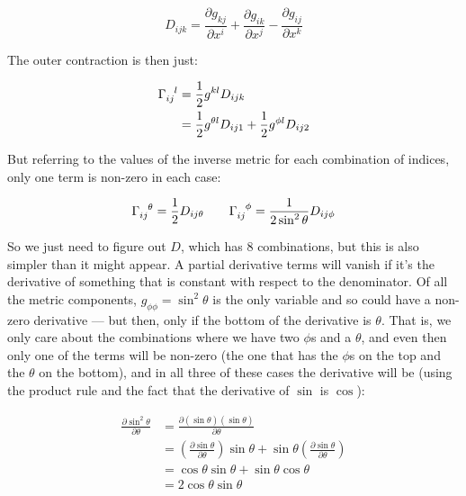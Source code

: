 $$
D_{ijk} 
= 
\frac{\partial g_{kj}}{\partial x^i} 
+
\frac{\partial g_{ik}}{\partial x^j} 
-
\frac{\partial g_{ij}}{\partial x^k} 
$$

The outer contraction is then just:

\begin{equation}    
\begin{split}
\Gamma\indices{_i_j^l}
&= \frac{1}{2} g^{kl} D_{ijk} \\
&= \frac{1}{2} g^{\theta l} D_{ij1} + \frac{1}{2} g^{\phi l} D_{ij2}
\end{split}
\end{equation}

But referring to the values of the inverse metric for each combination of indices, only one term is non-zero in each case:

$$
\Gamma\indices{_i_j^\theta} = \frac{1}{2} D_{ij\theta}
\quad \quad
\Gamma\indices{_i_j^\phi} = \frac{1}{2\sin^2 \theta} D_{ij\phi}
$$

So we just need to figure out $D$, which has 8 combinations, but this is also simpler than it might appear. A partial derivative terms will vanish if it's the derivative of something that is constant with respect to the denominator. Of all the metric components, $g_{\phi\phi} = \sin^2 \theta$ is the only variable and so could have a non-zero derivative --- but then, only if the bottom of the derivative is $\theta$. That is, we only care about the combinations where we have two $\phi$s and a $\theta$, and even then only one of the terms will be non-zero (the one that has the $\phi$s on the top and the $\theta$ on the bottom), and in all three of these cases the derivative will be (using the product rule and the fact that the derivative of $\sin$ is $\cos$):

\begin{equation}
    \begin{split}
        \frac{\partial \sin^2 \theta}{\partial \theta}
        &= \frac{\partial (\sin \theta)(\sin \theta)}{\partial \theta} \\
        &= \left(\frac{\partial \sin \theta}{\partial \theta}\right) \sin \theta
        + \sin \theta \left(\frac{\partial \sin \theta}{\partial \theta}\right) \\
        &= \cos \theta \sin \theta + \sin \theta \cos \theta \\
        &= 2\cos\theta\sin\theta            
    \end{split}
\end{equation}

